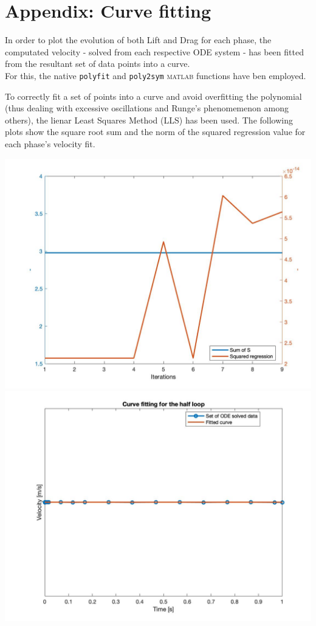 \section*{Appendix: Curve fitting}
In order to plot the evolution of both Lift and Drag for each phase, the computated velocity - solved from each respective ODE system - has been fitted from the resultant set of data points into a curve.\\
For this, the native \texttt{polyfit} and \texttt{poly2sym} \textsc{matlab} functions have ben employed. 

To correctly fit a set of points into a curve and avoid overfitting the polynomial (thus dealing with excessive oscillations and Runge's phenomemenon among others), the lienar Least Squares Method (LLS) has been used. The following plots show the square root sum and the norm of the squared regression value for each phase's velocity fit.

\begin{center}
	\includegraphics[width=0.45\linewidth]{../matlab/1/1reg.jpg}
	\includegraphics[width=0.45\linewidth]{../matlab/1/1fit.jpg}
	\vspace{0.5cm}
	\label{fig:1reg}
	\vspace{0.25cm}
	\label{fig:1fit}
\end{center}

